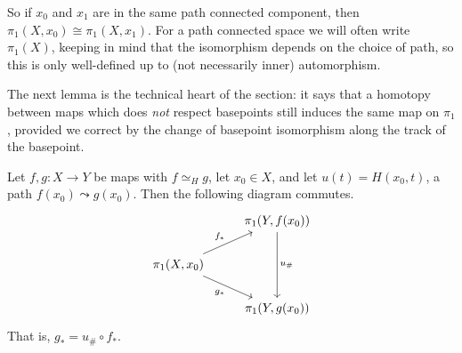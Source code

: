 So if $x_0$ and $x_1$ are in the same path connected component, then
$\pi_1(X, x_0) \cong \pi_1(X, x_1)$. For a path connected space we will often write
$\pi_1(X)$, keeping in mind that the isomorphism depends on the choice of path, so this
is only well-defined up to (not necessarily inner) automorphism.

The next lemma is the technical heart of the section: it says that a homotopy between
maps which does \emph{not} respect basepoints still induces the same map on $\pi_1$,
provided we correct by the change of basepoint isomorphism along the track of the
basepoint.

\begin{lemma} \label{lem:homotopy-basepoint}
	Let $f, g: X \to Y$ be maps with $f \simeq_H g$, let $x_0 \in X$, and let $u(t) = H(x_0, t)$, a path $f(x_0) \leadsto g(x_0)$. Then the following diagram commutes.
	\[\begin{tikzcd}
		& {\pi_1(Y, f(x_0))} \\
		{\pi_1(X, x_0)} \\
		& {\pi_1(Y, g(x_0))}
		\arrow["{f_*}", from=2-1, to=1-2]
		\arrow["{u_\#}", from=1-2, to=3-2]
		\arrow["{g_*}"', from=2-1, to=3-2]
	\end{tikzcd}\]
	That is, $g_* = u_\# \circ f_*$.
\end{lemma}
